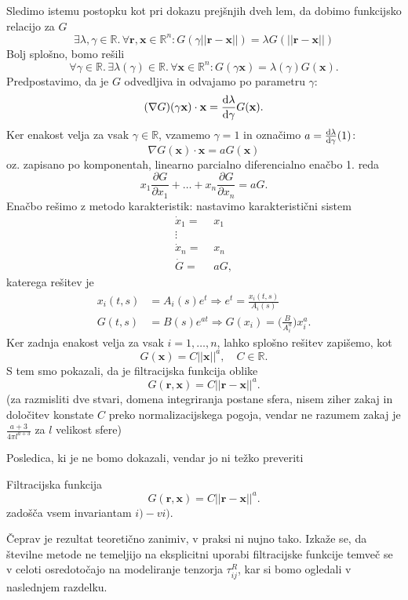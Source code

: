 \documentclass[mat2, tisk]{fmfdelo}
\newcommand{\R}{\mathbb R}
\newcommand{\bd}{\textbf}
\begin{document}
\begin{dokaz}
Sledimo istemu postopku kot pri dokazu prejšnjih dveh lem, da dobimo funkcijsko relacijo za $G$
$$
\exists \lambda, \gamma \in \R.\, \forall\bd{r}, \bd{x}\in \R^n: G(\gamma||\bd{r} - \bd{x}||) = \lambda G(||\bd{r} - \bd{x}||)
$$
Bolj splošno, bomo rešili 
$$
\forall \gamma\in \R.\, \exists \lambda(\gamma)\in \R.\, \forall \bd{x}\in \R^n: G(\gamma \bd{x}) = \lambda(\gamma) G(\bd{x}).
$$
Predpostavimo, da je $G$ odvedljiva in odvajamo po parametru $\gamma$:
$$
(\nabla G)(\gamma \bd{x}) \cdot \bd{x} = \frac{\dif \lambda}{\dif \gamma} G(\bd{x}).
$$
Ker enakost velja za vsak $\gamma \in \R$, vzamemo $\gamma = 1$ in označimo $a = \frac{\dif \lambda}{\dif \gamma}(1)$:
$$
\nabla G(\bd{x}) \cdot \bd{x} = a G(\bd{x})
$$
oz. zapisano po komponentah, linearno parcialno diferencialno enačbo 1. reda
$$
x_1\frac{\partial G}{\partial x_1} + \dots + x_n\frac{\partial G}{\partial x_n} = aG.
$$
Enačbo rešimo z metodo karakteristik: nastavimo karakteristični sistem 
\begin{align*}
\dot{x}_1 =&\,\, x_1 \\
\!\!\!\!\vdots \\
\dot{x}_n = &\,\, x_n \\
\dot{G} =&\,\, aG,
\end{align*}
katerega rešitev je 
\begin{align*}
x_i(t, s) &= A_i(s) e^t \Longrightarrow e^t = \frac{x_i(t, s)}{A_i(s)}\\
G(t, s) &= B(s) e^{at} \Longrightarrow G(x_i) = \Big(\frac{B}{A_i^a}\Big) x_i^a.
\end{align*}
Ker zadnja enakost velja za vsak $i=1,\dots, n$, lahko splošno rešitev zapišemo, kot 
$$
G(\bd{x}) = C ||\bd{x}||^a, \quad C\in \R.
$$
S tem smo pokazali, da je filtracijska funkcija oblike 
$$
G(\bd{r}, \bd{x}) = C||\bd{r} - \bd{x}||^a.
$$
(za razmisliti dve stvari, domena integriranja postane sfera, nisem ziher zakaj in 
določitev konstate $C$ preko normalizacijskega pogoja, vendar ne razumem zakaj je $\frac{a+3}{4\pi l^{a+3}} $
za $l$ velikost sfere)
\end{dokaz}

Posledica, ki je ne bomo dokazali, vendar jo ni težko preveriti

\begin{posledica}
Filtracijska funkcija 
$$
G(\bd{r}, \bd{x}) = C||\bd{r} - \bd{x}||^a.
$$
zadošča vsem invariantam $i) - vi)$.
\end{posledica}

Čeprav je rezultat teoretično zanimiv, v praksi ni nujno tako. Izkaže se, da številne
metode ne temeljijo na eksplicitni uporabi filtracijske funkcije temveč se v celoti osredotočajo
na modeliranje tenzorja $\tau_{ij}^R$, kar si bomo ogledali v naslednjem razdelku. 
\end{document}
